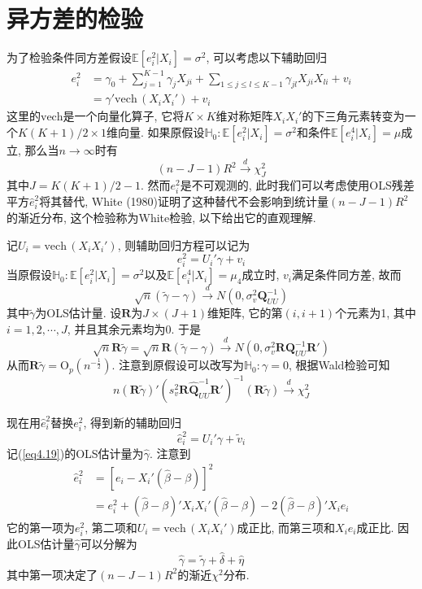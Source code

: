 \documentclass[cn, 12pt, math=mtpro2, bibstyle=apa, blue, twocol]{elegantbook}
\newcommand{\RH}{\mathbold{R}}
\newcommand{\E}{\mathbb{E}}
\newcommand{\Q}{\mathbold{Q}}
\newcommand{\hb}{\hat{\beta}}
\newcommand{\HH}{\mathbb{H}}
\begin{document}
\section{异方差的检验}

为了检验条件同方差假设$\E[e_i^2|X_i]=\sigma^2$, 可以考虑以下辅助回归
\begin{align*}
e_i^2&=\gamma_0+\sum_{j=1}^{K-1}\gamma_jX_{ji}+\sum_{1\leq j\leq l\leq K-1}\gamma_{jl}X_{ji}X_{li}+v_i \\
&=\gamma'\text{vech}\,(X_iX_i')+v_i
\end{align*}
这里的$\text{vech}$是一个向量化算子, 它将$K\times K$维对称矩阵$X_iX_i'$的下三角元素转变为一个$K(K+1)/2\times 1$维向量. 如果原假设$\HH_0:\E[e_i^2|X_i]=\sigma^2$和条件$\E[e_i^4|X_i]=\mu$成立, 那么当$n\to\infty$时有
$$(n-J-1)R^2\xrightarrow{d}\chi^2_J$$
其中$J=K(K+1)/2-1$. 然而$e_i^2$是不可观测的, 此时我们可以考虑使用OLS残差平方$\hat{e}_i^2$将其替代, White (1980)证明了这种替代不会影响到统计量$(n-J-1)R^2$的渐近分布, 这个检验称为White检验, 以下给出它的直观理解.

记$U_i=\text{vech}\,(X_iX_i')$, 则辅助回归方程可以记为
$$e_i^2=U_i'\gamma+v_i$$
当原假设$\HH_0:\E[e_i^2|X_i]=\sigma^2$以及$\E[e_i^4|X_i]=\mu_4$成立时, $v_i$满足条件同方差, 故而
$$\sqrt{n}(\tilde{\gamma}-\gamma)\xrightarrow{d}N(0,\sigma_v^2\Q_{UU}^{-1})$$
其中$\tilde{\gamma}$为OLS估计量. 设$\RH$为$J\times(J+1)$维矩阵, 它的第$(i,i+1)$个元素为1, 其中$i=1,2,\cdots,J$, 并且其余元素均为0. 于是
$$\sqrt{n}\RH\tilde{\gamma}=\sqrt{n}\RH(\tilde{\gamma}-\gamma)\xrightarrow{d} N(0,\sigma_v^2\RH\Q_{UU}^{-1}\RH')$$
从而$\RH\tilde{\gamma}=\text{O}_p(n^{-\frac{1}{2}})$. 注意到原假设可以改写为$\HH_0:\gamma=0$, 根据Wald检验可知
$$n(\RH\tilde{\gamma})'(s_v^2\RH\hat{\Q}_{UU}^{-1}\RH')^{-1}(\RH\tilde{\gamma})\xrightarrow{d}\chi^2_J$$

现在用$\hat{e}_i^2$替换$e_i^2$, 得到新的辅助回归
\begin{equation}\label{eq4.19}
  \hat{e}_i^2=U_i'\gamma+\tilde{v}_i
\end{equation}
记(\ref{eq4.19})的OLS估计量为$\hat{\gamma}$. 注意到
\begin{align*}
\hat{e}_i^2&=[e_i-X_i'(\hb-\beta)]^2 \\
&=e_i^2+(\hb-\beta)'X_iX_i'(\hb-\beta)-2(\hb-\beta)'X_ie_i
\end{align*}
它的第一项为$e_i^2$, 第二项和$U_i=\text{vech}\,(X_iX_i')$成正比, 而第三项和$X_ie_i$成正比. 因此OLS估计量$\hat{\gamma}$可以分解为
$$\hat{\gamma}=\tilde{\gamma}+\hat{\delta}+\hat{\eta}$$
其中第一项决定了$(n-J-1)R^2$的渐近$\chi^2$分布.
\end{document}

